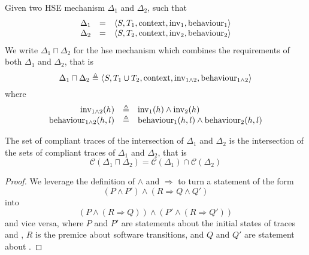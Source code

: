 \begin{definition}
  Given two HSE mechanism $\Delta_1$ and $\Delta_2$, such that
%
  \[
    \begin{array}{rcl}
      \Delta_1
      & =
      & \langle S, T_1, \mathrm{context}, \mathrm{inv}_1, \mathrm{behaviour}_1
        \rangle \\
      \Delta_2
      & =
      & \langle S, T_2, \mathrm{context}, \mathrm{inv}_2, \mathrm{behaviour}_2
        \rangle
    \end{array}
  \]
%
  We write $\Delta_1 \sqcap \Delta_2$ for the \ac{hse} mechanism which combines
  the requirements of both $\Delta_1$ and $\Delta_2$, that is
%
  \[
    \Delta_1 \sqcap \Delta_2 \triangleq \langle S, T_1 \cup T_2, \mathrm{context},
    \mathrm{inv}_{1\wedge2}, \mathrm{behaviour}_{1\wedge2} \rangle
  \]
%
  where
  \[
    \begin{array}{rcl}
      \mathrm{inv}_{1\wedge2}(h)
      & \triangleq
      & \mathrm{inv}_1(h) \wedge \mathrm{inv}_2(h) \\
      \mathrm{behaviour}_{1\wedge2}(h,l)
      & \triangleq
      & \mathrm{behaviour}_1(h,l) \wedge \mathrm{behaviour}_2(h,l)
    \end{array}
  \]
\end{definition}

\begin{lemma}
  \label{lemma:speccert:compinter}
  The set of compliant traces of the intersection of $\Delta_1$ and $\Delta_2$
  is the intersection of the sets of compliant traces of $\Delta_1$ and
  $\Delta_2$, that is
  \[
    \mathcal{C}(\Delta_1 \sqcap \Delta_2) = \mathcal{C}(\Delta_1) \cap
    \mathcal{C}(\Delta_2)
  \]

  \begin{proof}
    We leverage the definition of $\wedge$ and $\Rightarrow$ to turn a statement
    of the form
    \[
      (P \wedge P') \wedge (R \Rightarrow Q \wedge Q')
    \]
    into
    \[
      (P \wedge (R \Rightarrow Q)) \wedge (P' \wedge (R \Rightarrow Q'))
    \]
    and vice versa, where $P$ and $P'$ are statements about the initial states
    of traces and , $R$ is the premice about software transitions, and
    $Q$ and $Q'$ are statement about .
  \end{proof}
\end{lemma}

